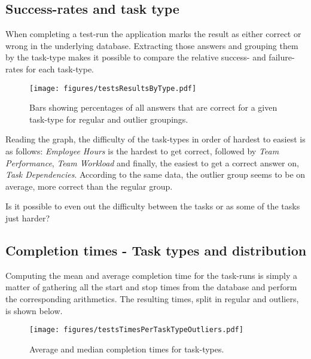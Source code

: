  \subsection{Success-rates and task type}

    When completing a test-run the application marks the result as
    either correct or wrong in the underlying database. Extracting
    those answers and grouping them by the task-type makes it possible to
    compare the relative success- and failure-rates for each task-type.

    \begin{figure}[h!]
      \centering
      \texttt{[image: figures/testsResultsByType.pdf]}
      \caption{
        Bars showing percentages of all answers that are correct for a
        given task-type for regular and outlier groupings.
      }
    \end{figure}



    Reading the graph, the difficulty of the task-types in order of hardest
    to easiest is as follows: \textit{Employee Hours} is the hardest to get
    correct, followed by \textit{Team Performance}, \textit{Team Workload}
    and finally, the easiest to get a correct answer on, \textit{Task
      Dependencies}. According to the same data, the outlier group seems to
    be on average, more correct than the regular group.

		\iterchange Is it possible to even out the difficulty between the tasks or
		as some of the tasks just harder?

  \subsection{Completion times - Task types and distribution}

    Computing the mean and average completion time for the task-runs is
    simply a matter of gathering all the start and stop times from the
    database and perform the corresponding arithmetics. The resulting times,
    split in regular and outliers, is shown below.

    \begin{figure}[h!]
      \centering
      \texttt{[image: figures/testsTimesPerTaskTypeOutliers.pdf]}
      \caption{Average and median completion times for task-types. }
      \label{label_testsTimesPerTaskTypeOutliers}
    \end{figure}


